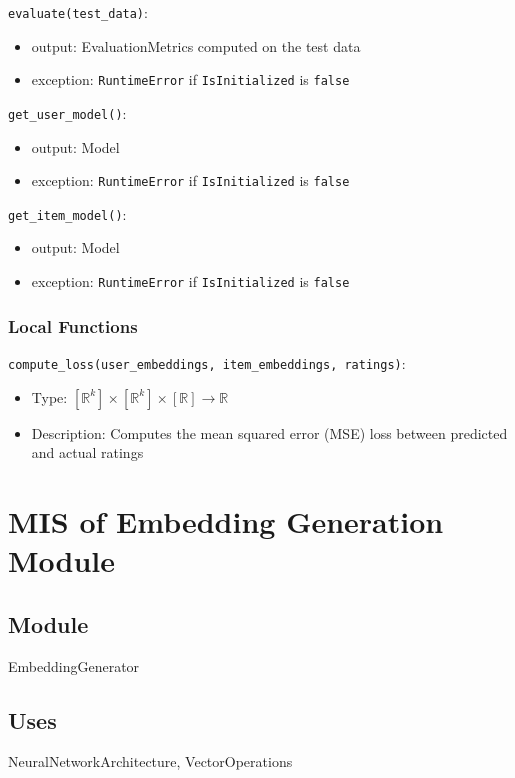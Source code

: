 \documentclass[12pt, titlepage]{article}
\begin{document}
\noindent \texttt{evaluate(test\_data)}:
\begin{itemize}
\item output: EvaluationMetrics computed on the test data
\item exception: \texttt{RuntimeError} if \texttt{IsInitialized} is \texttt{false}
\end{itemize}

\noindent \texttt{get\_user\_model()}:
\begin{itemize}
\item output: Model
\item exception: \texttt{RuntimeError} if \texttt{IsInitialized} is \texttt{false}
\end{itemize}

\noindent \texttt{get\_item\_model()}:
\begin{itemize}
\item output: Model
\item exception: \texttt{RuntimeError} if \texttt{IsInitialized} is \texttt{false}
\end{itemize}

\subsubsection{Local Functions}

\noindent \texttt{compute\_loss(user\_embeddings, item\_embeddings, ratings)}:
\begin{itemize}
\item Type: $[\mathbb{R}^k] \times [\mathbb{R}^k] \times [\mathbb{R}] \rightarrow \mathbb{R}$
\item Description: Computes the mean squared error (MSE) loss between predicted and actual ratings
\end{itemize}

\newpage

\section{MIS of Embedding Generation Module} \label{ModuleEG}

\subsection{Module}

EmbeddingGenerator

\subsection{Uses}
NeuralNetworkArchitecture, VectorOperations
\end{document}
